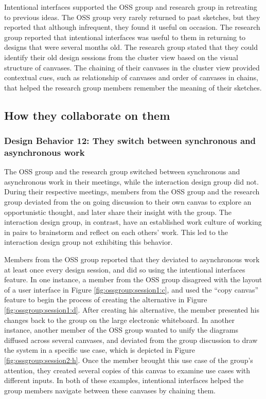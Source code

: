 Intentional interfaces supported the OSS group and research group in retreating to previous ideas. The OSS group very rarely returned to past sketches, but they reported that although infrequent, they found it useful on occasion. The research group reported that intentional interfaces was useful to them in returning to designs that were several months old. The research group stated that they could identify their old design sessions from the cluster view based on the visual structure of canvases. The chaining of their canvases in the cluster view provided contextual cues, such as relationship of canvases and order of canvases in chains, that helped the research group members remember the meaning of their sketches. 

\subsection{How they collaborate on them}

\subsubsection{Design Behavior 12: They switch between synchronous and asynchronous work}

The OSS group and the research group switched between synchronous and asynchronous work in their meetings, while the interaction design group did not. During their respective meetings, members from the OSS group and the research group deviated from the on going discussion to their own canvas to explore an opportunistic thought, and later share their insight with the group. The interaction design group, in contrast, have an established work culture of working in pairs to brainstorm and reflect on each others' work. This led to the interaction design group not exhibiting this behavior.

Members from the OSS group reported that they deviated to asynchronous work at least once every design session, and did so using the intentional interfaces feature. 
In one instance, a member from the OSS group disagreed with the layout of a user interface in Figure \ref{fig:ossgroup:session1:c}, and used the ``copy canvas'' feature to begin the process of creating the alternative in Figure \ref{fig:ossgroup:session1:d}. After creating his alternative, the member presented his changes back to the group on the large electronic whiteboard. In another instance, another member of the OSS group wanted to unify the diagrams diffused across several canvases, and deviated from the group discussion to draw the system in a specific use case, which is depicted in Figure \ref{fig:ossgroup:session2:h}. Once the member brought this use case of the group's attention, they created several copies of this canvas to examine use cases with different inputs. In both of these examples, intentional interfaces helped the group members navigate between these canvases by chaining them.

